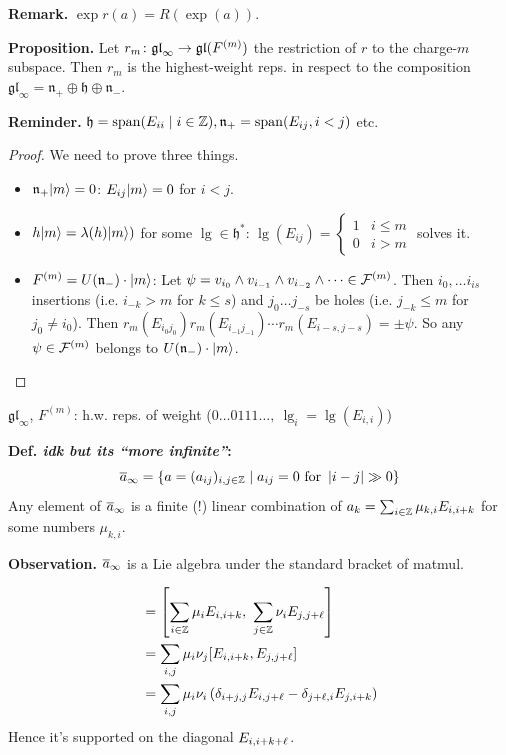 \documentclass[]{../../../../tex/classes/styledArticle}
\newcommand\gl {\mathfrak{gl}}
\begin{document}
	\textbf{Remark. }$\exp r(a) = R(\exp (a))$. 
	
	\newcommand\fn{\mathfrak{n}}
	\newcommand\fh{\mathfrak{h}}
	\textbf{Proposition. }Let $r_m \co \gl_\infty \to \gl(F^{(m)})$ the restriction of $r$ to the charge-$m$ subspace. Then $r_m$ is the highest-weight reps. in respect to the composition $\gl_\infty = \fn_+\oplus\fh\oplus \fn_-$. 
	
	\textbf{Reminder. }$\fh = \Sp(E_{ii} \mid i \in \Z), \fn_+ = \Sp(E_{ij}, i< j)$ etc. 
	
	\begin{proof}
		We need to prove three things. 
		\begin{itemize}
			\item $\fn_+| m \ra = 0$: $E_{ij}|m\rangle = 0$ for $i < j$. 
			\item $h|m \rangle = \lambda(h)| m \rangle)$ for some $\lg \in \fh^*$: $\lg(E_{ij}) = \begin{cases}
				1 & i \le m \\
				0 & i > m
			\end{cases}$ solves it. 
			\item $F^{(m)} = U(\fn_-) \cdot | m \ra $: Let $\psi = v_{i_0} \land v_{i_{-1}} \land v_{i_{-2}} \land \cdots \in \mathcal{F}^{(m)}$. Then \set $i_0, \dots i_{is}$ insertions (i.e. $i_{-k} > m$ for $k \le s$) and \set $j_0 \dots j_{-s}$ be holes (i.e. $j_{-k} \le m$ for $j_0 \neq i_0$). Then $r_m(E_{i_0j_0})r_m(E_{i_{-1}j_{-1}}) \cdots r_m(E_{i - s, j -s}) = \pm \psi$. So any $\psi \in \mathcal{F}^{(m)}$ belongs to $U(\fn_-) \cdot |m\ra$. 
		\end{itemize}
	\end{proof}
	
	$\gl_\infty$, $F^{(m)}$: h.w. reps. of weight ($0 \dots 0 1 1 1 \dots, \ \lg_i = \lg(E_{i, i})$)
	
	
	\textbf{Def. \textit{idk but its ``more infinite''}: }
	\[ \overline a _\infty = \left \{ a = (a_{ij})_{i, j \in \mathbb{Z}} \mid a_{ij} = 0 \ \text{for}\ \left \lvert i - j \right \rvert \gg 0 \right \} \]
	Any element of $\overline a_\infty$ is a finite (!) linear combination of $a_k = \sum_{i \in \mathbb{Z}} \mu_{k, i}E_{i, i + k}$  for some numbers $\mu_{k, i}$. 
	
	\textbf{Observation. }$\overline a_\infty$ is a Lie algebra under the standard bracket of matmul. 
	
	\begin{align*}
		[a_k, a_\ml] &= \csb{\sum_{i \in \Z}\mu_i E_{i, i + k}, \ \sum_{j \in \Z}\nu_i E_{j, j + \ml}} \\
		&= \sum_{i, j}\mu_i\nu_j [E_{i, i + k}, E_{j, j + \ml}] \\
		&= \sum_{i, j}\mu_i\nu_i \cl{\dg_{i + j, j}E_{i, j + \ml} - \dg_{j + \ml, i}E_{j, i + k}}
	\end{align*}
	Hence it's supported on the diagonal $E_{i, i + k + \ell}$. 
	
\end{document}

